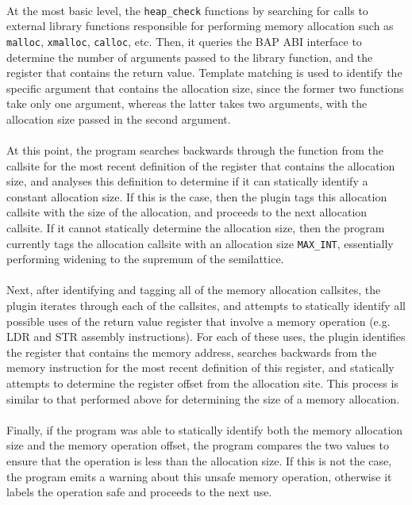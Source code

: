 \documentclass[letterpaper,11pt]{article}
\begin{document}
\paragraph{}
At the most basic level, the \texttt{heap\_check} functions by searching for calls to
external library functions responsible for performing memory allocation such as
\texttt{malloc}, \texttt{xmalloc}, \texttt{calloc}, etc. Then, it queries the
BAP ABI interface to determine the number of arguments passed to the library
function, and the register that contains the return value. Template matching is
used to identify the specific argument that contains the allocation size, since
the former two functions take only one argument, whereas the latter takes two
arguments, with the allocation size passed in the second argument.

\paragraph{}
At this point, the program searches backwards through the function from the
callsite for the most recent definition of the register that contains the
allocation size, and analyses this definition to determine if it can statically
identify a constant allocation size. If this is the case, then the plugin tags
this allocation callsite with the size of the allocation, and proceeds to the
next allocation callsite. If it cannot statically determine the allocation
size, then the program currently tags the allocation callsite with an
allocation size \texttt{MAX\_INT}, essentially performing widening to the supremum of the
semilattice.

\paragraph{}
Next, after identifying and tagging all of the memory allocation callsites, the
plugin iterates through each of the callsites, and attempts to statically
identify all possible uses of the return value register that involve a memory
operation (e.g. LDR and STR assembly instructions). For each of these uses, the
plugin identifies the register that contains the memory address, searches
backwards from the memory instruction for the most recent definition of this
register, and statically attempts to determine the register offset from the
allocation site. This process is similar to that performed above for
determining the size of a memory allocation.

\paragraph{}
Finally, if the program was able to statically identify both the memory
allocation size and the memory operation offset, the program compares the two
values to ensure that the operation is less than the allocation size. If this
is not the case, the program emits a warning about this unsafe memory
operation, otherwise it labels the operation safe and proceeds to the next use.
\end{document}
